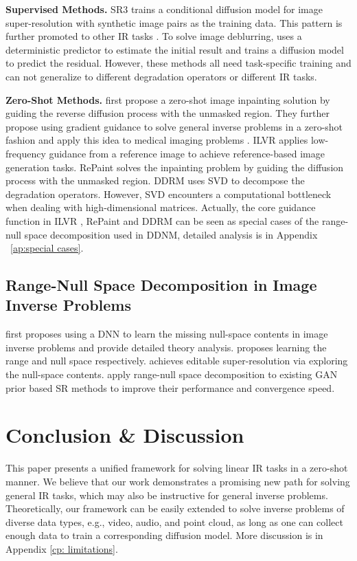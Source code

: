 \documentclass{article} \usepackage{iclr2023_conference,times}
\begin{document}
\textbf{Supervised Methods.} SR3 \citep{sr3} trains a conditional diffusion model for image super-resolution with synthetic image pairs as the training data. This pattern is further promoted to other IR tasks \citep{saharia2022palette}. To solve image deblurring, \cite{whang2022deblurring} uses a deterministic predictor to estimate the initial result and trains a diffusion model to predict the residual. However, these methods all need task-specific training and can not generalize to different degradation operators or different IR tasks.

\textbf{Zero-Shot Methods.} \cite{song2019generative} first propose a zero-shot image inpainting solution by guiding the reverse diffusion process with the unmasked region. They further propose using gradient guidance to solve general inverse problems in a zero-shot fashion and apply this idea to medical imaging problems \citep{song2020score,song2021solving}. ILVR \citep{choi2021ilvr} applies low-frequency guidance from a reference image to achieve reference-based image generation tasks. RePaint \citep{lugmayr2022repaint} solves the inpainting problem by guiding the diffusion process with the unmasked region. DDRM \citep{kawar2022denoising} uses SVD to decompose the degradation operators. However, SVD encounters a computational bottleneck when dealing with high-dimensional matrices. Actually, the core guidance function in ILVR \citep{choi2021ilvr}, RePaint \citep{lugmayr2022repaint} and DDRM \citep{kawar2022denoising} can be seen as special cases of the range-null space decomposition used in DDNM, detailed analysis is in Appendix ~\ref{ap:special cases}. 

\subsection{Range-Null Space Decomposition in Image Inverse Problems}
\cite{schwab2019deep} first proposes using a DNN to learn the missing null-space contents in image inverse problems and provide detailed theory analysis. \cite{chen2020deep} proposes learning the range and null space respectively. \cite{bahat2020explorable} achieves editable super-resolution via exploring the null-space contents. \cite{wang2022gan} apply range-null space decomposition to existing GAN prior based SR methods to improve their performance and convergence speed.


\section{Conclusion \& Discussion}
This paper presents a unified framework for solving linear IR tasks in a zero-shot manner. We believe that our work demonstrates a promising new path for solving general IR tasks, which may also be instructive for general inverse problems. Theoretically, our framework can be easily extended to solve inverse problems of diverse data types, e.g., video, audio, and point cloud, as long as one can collect enough data to train a corresponding diffusion model. More discussion is in Appendix \ref{cp: limitations}.
\end{document}
